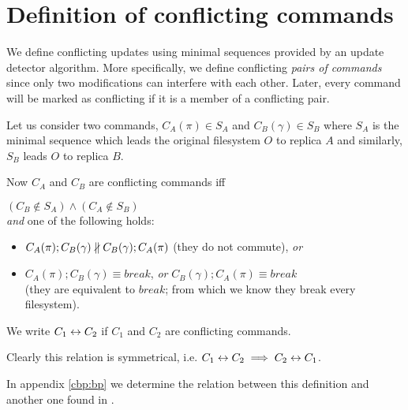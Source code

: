 \section{Definition of conflicting commands}
\label{cbp:defconfl}

We define conflicting updates using minimal sequences provided by an
update detector algorithm. More specifically, we define conflicting \emph{pairs
of commands} since only two modifications can interfere with each other.
Later, every command will be marked as conflicting if it is a member of a
conflicting pair.

Let us consider two commands, \(C_A(\pi)\in S_A\) and \(C_B(\gamma)\in S_B\) 
where \(S_A\) is the minimal sequence which
leads the original filesystem \(O\) to replica \(A\) and similarly,
\(S_B\) leads \(O\) to replica \(B\).

Now \(C_A\) and \(C_B\) are conflicting commands iff
\begin{center}
\((C_B\not\in S_A)\wedge(C_A\not\in S_B)\)\\\medskip
\emph{and} one of the following holds:\\\medskip
\begin{minipage}{12cm}
\begin{itemize}
\item \(C_A(\pi); C_B(\gamma) \nparallel C_B(\gamma); C_A(\pi)\)
 (they do not commute), \emph{or}
\item \(C_A(\pi); C_B(\gamma) \equiv break\), \emph{or}
\(C_B(\gamma); C_A(\pi) \equiv break\)\\(they are equivalent to \(break\);
from which we know they break every filesystem).
\end{itemize}\end{minipage}
\end{center}

We write \(C_1\leftrightarrow C_2\) if \(C_1\) and \(C_2\) are conflicting
commands.
\begin{notrsi}
Clearly this relation is symmetrical, i.e.
\(C_1\leftrightarrow C_2\implies C_2\leftrightarrow C_1\).
\end{notrsi}

In appendix \ref{cbp:bp} we determine the relation between this
definition and another one found in \BP.

